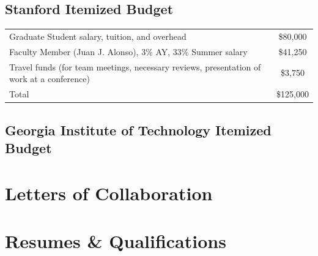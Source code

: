 \documentclass[]{aiaa-tc}
\begin{document}
  \subsection{Stanford Itemized Budget}
    \begin{table}\begin{tabular}{l|c}
    Graduate Student salary, tuition, and overhead &  \$80,000 \\
    Faculty Member (Juan J. Alonso), 3\% AY, 33\% Summer salary & \$41,250 \\
    Travel funds (for team meetings, necessary reviews, presentation of work at a conference) & \$3,750 \\
    \hline
    Total & \$125,000 \\ 
    \hline
    \end{tabular}\end{table}
  \subsection{Georgia Institute of Technology Itemized Budget}

  \clearpage

  \section{Letters of Collaboration}

    
    
    \restoregeometry


  \section{Resumes \& Qualifications}

    \clearpage
    
    \restoregeometry
    \newpage
    
    \newpage
    
    

    
    
    
   
    \restoregeometry



    
\end{document}
